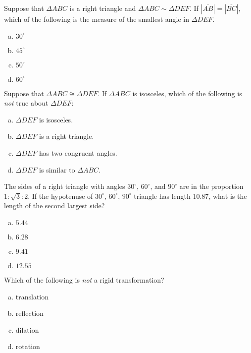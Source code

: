 \documentclass[12pt,letterpaper]{exam}
\begin{document}
\begin{questions}
\question Suppose that $\Delta ABC$ is a right triangle and $\Delta ABC \sim \Delta DEF$. If $|\overline{AB}| = |\overline{BC}|$, which of the following is the measure of the smallest angle in $\Delta DEF$.
	\begin{enumerate}[(a)]
	\item $30^\circ$
	\item $45^\circ$
	\item $50^\circ$
	\item $60^\circ$
	\end{enumerate} \vfill



\question Suppose that $\Delta ABC \cong \Delta DEF$. If $\Delta ABC$ is isosceles, which of the following is \textit{not} true about $\Delta DEF$:
	\begin{enumerate}[(a)]
	\item $\Delta DEF$ is isosceles. 
	\item $\Delta DEF$ is a right triangle.
	\item $\Delta DEF$ has two congruent angles. 
	\item $\Delta DEF$ is similar to $\Delta ABC$.
	\end{enumerate} \vfill



\newpage



\question The sides of a right triangle with angles $30^\circ$, $60^\circ$, and $90^\circ$ are in the proportion $1 \colon \sqrt{3} \colon 2$. If the hypotenuse of $30^\circ$, $60^\circ$, $90^\circ$ triangle has length $10.87$, what is the length of the second largest side?
	\begin{enumerate}[(a)]
	\item $5.44$
	\item $6.28$
	\item $9.41$
	\item $12.55$
	\end{enumerate} \vfill



\question Which of the following is \textit{not} a rigid transformation?
	\begin{enumerate}[(a)]
	\item translation
	\item reflection
	\item dilation
	\item rotation 	
	\end{enumerate} \vfill




\end{questions}
\end{document}
